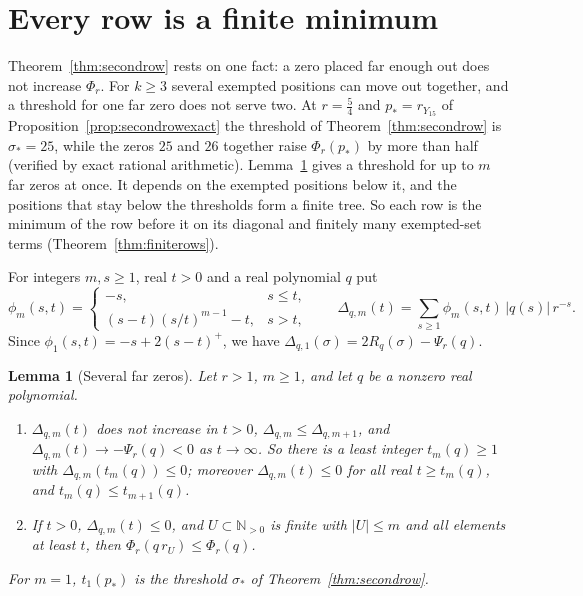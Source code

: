 \documentclass[11pt]{article}
\newtheorem{lemma}[theorem]{Lemma}
\newcommand{\N}{\mathbb N}
\begin{document}
\section{Every row is a finite minimum}\label{sec:finiterows}

Theorem~\ref{thm:secondrow} rests on one fact: a zero placed far enough out
does not increase $\Phi_r$.  For $k\ge3$ several exempted positions can
move out together, and a threshold for one far zero does not serve two.  At
$r=\frac54$ and $p_*=r_{Y_{15}}$ of Proposition~\ref{prop:secondrowexact}
the threshold of Theorem~\ref{thm:secondrow} is $\sigma_*=25$, while the
zeros $25$ and $26$ together raise $\Phi_r(p_*)$ by more than half
(verified by exact rational arithmetic).  Lemma~\ref{lem:farzeros} gives a threshold
for up to $m$ far zeros at once.  It depends on the exempted positions below
it, and the positions that stay below the thresholds form a finite tree.  So
each row is the minimum of the row before it on its diagonal and finitely
many exempted-set terms (Theorem~\ref{thm:finiterows}).

For integers $m,s\ge1$, real $t>0$ and a real polynomial $q$ put
\[
  \phi_m(s,t)=\begin{cases}-s,&s\le t,\\(s-t)(s/t)^{m-1}-t,&s>t,\end{cases}
  \qquad
  \Delta_{q,m}(t)=\sum_{s\ge1}\phi_m(s,t)\,|q(s)|\,r^{-s}.
\]
Since $\phi_1(s,t)=-s+2(s-t)^+$, we have
$\Delta_{q,1}(\sigma)=2R_q(\sigma)-\Psi_r(q)$.

\begin{lemma}[Several far zeros]\label{lem:farzeros}
Let $r>1$, $m\ge1$, and let $q$ be a nonzero real polynomial.
\begin{enumerate}
\item[(a)] $\Delta_{q,m}(t)$ does not increase in $t>0$,
$\Delta_{q,m}\le\Delta_{q,m+1}$, and $\Delta_{q,m}(t)\to-\Psi_r(q)<0$ as
$t\to\infty$.  So there is a least integer $t_m(q)\ge1$ with
$\Delta_{q,m}(t_m(q))\le0$; moreover $\Delta_{q,m}(t)\le0$ for all real
$t\ge t_m(q)$, and $t_m(q)\le t_{m+1}(q)$.
\item[(b)] If $t>0$, $\Delta_{q,m}(t)\le0$, and $U\subset\N_{>0}$ is finite
with $|U|\le m$ and all elements at least $t$, then
$\Phi_r(q\,r_U)\le\Phi_r(q)$.
\end{enumerate}
For $m=1$, $t_1(p_*)$ is the threshold $\sigma_*$ of
Theorem~\ref{thm:secondrow}.
\end{lemma}
\end{document}
